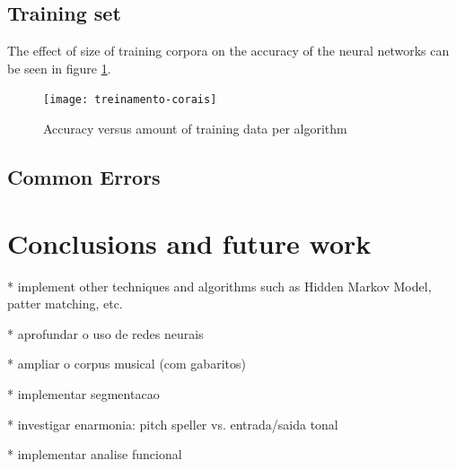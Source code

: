 \documentclass{article}
\begin{document}
\subsection{Training set}

The effect of size of training corpora on the accuracy of the neural
networks can be seen in figure \ref{fig:treinamento-corais}.

\begin{figure}
  \texttt{[image: treinamento-corais]}
  \caption{Accuracy versus amount of training data per algorithm}
  \label{fig:treinamento-corais}
\end{figure}

\subsection{Common Errors}



\section{Conclusions and future work}
\label{sec:concl-future-work}


* implement other techniques and algorithms such as Hidden Markov
Model, patter matching, etc.

* aprofundar o uso de redes neurais

* ampliar o corpus musical (com gabaritos)

* implementar segmentacao

* investigar enarmonia: pitch speller vs. entrada/saida tonal

* implementar analise funcional



\end{document}
